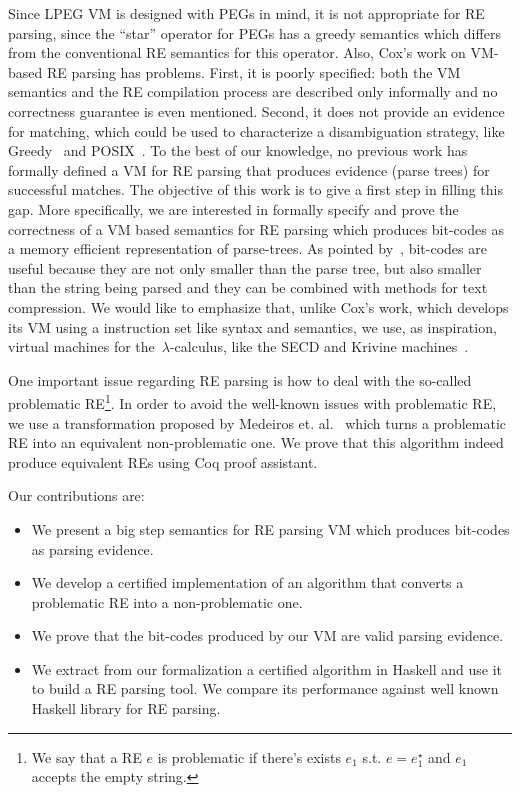 \documentclass[review]{elsarticle}
\theoremstyle{definition}
\begin{document}
Since LPEG VM is designed with PEGs in mind, it is not appropriate for RE parsing, since the ``star''
operator for PEGs has a greedy semantics which differs from the conventional RE semantics for this operator. 
Also, Cox's work on VM-based RE parsing has problems. First, it is poorly specified: both the VM semantics 
and the RE compilation process are described only informally and no correctness guarantee is even mentioned. 
Second, it does not provide an evidence for matching, which could be used to characterize a disambiguation 
strategy, like Greedy~\cite{Frisch2004} and POSIX~\cite{Sulzmann14}. To the best of our knowledge, no 
previous work has formally defined a VM for RE parsing that produces evidence (parse trees) for successful matches.
The objective of this work is to give a first step in filling this gap. More specifically, we are interested in formally
specify and prove the correctness of a VM based semantics for RE parsing which produces bit-codes as
a memory efficient representation of parse-trees. As pointed by~\cite{Lasse2011}, bit-codes are useful because they
are not only smaller than the parse tree, but also smaller than the string being parsed and they can be combined with methods
for text compression. We would like to emphasize that, unlike Cox's work, which develops its VM using a instruction 
set like syntax and semantics, we use, as inspiration, virtual machines for the~$\lambda$-calculus, like the 
SECD and Krivine machines~\cite{Krivine07,Landin64}. 

One important issue regarding RE parsing is how to deal with the so-called problematic 
RE\footnote{We say that a RE $e$ is problematic if there's exists $e_1$ s.t. $e = e_1^\star$ and 
$e_1$ accepts the empty string.}\cite{Frisch2004}. In order to avoid the well-known issues with 
problematic RE, we use a transformation proposed by Medeiros et. al.~\cite{Medeiros14} which turns a
problematic RE into an equivalent non-problematic one. We prove that this algorithm indeed produce
equivalent REs using Coq proof assistant.

Our contributions are:

\begin{itemize}
  \item We present a big step semantics for RE parsing VM which produces bit-codes as parsing evidence.
  \item We develop a certified implementation of an algorithm that converts a problematic RE into a 
  non-problematic one.
  \item We prove that the bit-codes produced by our VM are valid parsing evidence.
  \item We extract from our formalization a certified algorithm in Haskell and use it 
  to build a RE parsing tool. We compare its performance against 
  well known Haskell library for RE parsing.  
\end{itemize}
\end{document}
